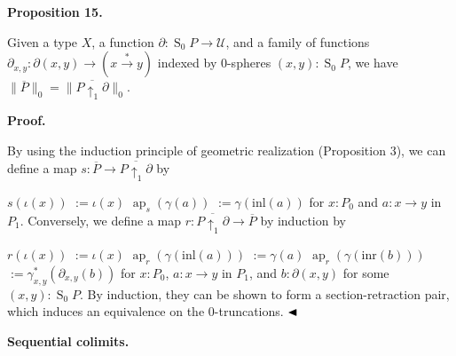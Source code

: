  
 
\par\medskip\noindent\textbf{Proposition 15.}\par
 
 
Given a type $X$, a function $\partial:\operatorname{S}_{0}P\to\mathcal{U}$, and a family of functions $\partial_{x,y}:\partial(x,y)\to(x\overset{*}{\to}y)$ indexed by 0-spheres $(x,y):\operatorname{S}_{0}P$, we have $\|\overline{P}\|_{0}=\|\overline{P{\uparrow_{1}}\partial}\|_{0}$.\par
 
 
 
 
 
\par\medskip\noindent\textbf{Proof.}\par
 
 
By using the induction principle of geometric realization (Proposition 3), we can define a map $s:\overline{P}\to\overline{P{\uparrow_{1}}\partial}$ by\par
    $\displaystyle s(\iota(x))$ $\displaystyle:=\iota(x)$ $\displaystyle\operatorname{ap}_{s}(\gamma(a))$ $\displaystyle:=\gamma(\mathrm{inl}(a))$    
for $x:P_{0}$ and $a:x\to y$ in $P_{1}$. Conversely, we define a map $r:\overline{P{\uparrow_{1}}\partial}\to\overline{P}$ by induction by\par
    $\displaystyle r(\iota(x))$ $\displaystyle:=\iota(x)$ $\displaystyle\operatorname{ap}_{r}(\gamma(\mathrm{inl}(a)))$ $\displaystyle:=\gamma(a)$ $\displaystyle\operatorname{ap}_{r}(\gamma(\mathrm{inr}(b)))$ $\displaystyle:=\gamma^{*}_{x,y}(\partial_{x,y}(b))$    
for $x:P_{0}$, $a:x\to y$ in $P_{1}$, and $b:\partial(x,y)$ for some $(x,y):\operatorname{S}_{0}P$. By induction, they can be shown to form a section-retraction pair, which induces an equivalence on the 0-truncations. $\hfill\blacktriangleleft$\par
 
 
 
 
\par\medskip\noindent\textbf{Sequential colimits.}\par
 
